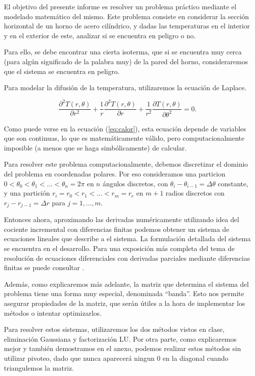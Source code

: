 
El objetivo del presente informe es resolver un problema práctico mediante el modelado matemático del mismo. Este problema consiste en considerar la sección horizontal de un horno de acero cilíndrico, y dadas las temperaturas en el interior y en el exterior de este, analizar si se encuentra en peligro o no.

Para ello, se debe encontrar una cierta isoterma, que si se encuentra muy cerca (para algún significado de la palabra muy) de la pared del horno, consideraremos que el sistema se encuentra en peligro.

Para modelar la difusión de la temperatura, utilizaremos la ecuación de Laplace.

\begin{equation}\label{eq:calor}
\frac{\partial^2T(r,\theta)}{\partial r^{2}}+\frac1r \frac{\partial^2 T(r,\theta)}{\partial r} + \frac{1}{r^2} \frac{\partial T(r, \theta)}{\partial \theta^2} = 0.
\end{equation}

Como puede verse en la ecuación (\ref{eq:calor}), esta ecuación depende de variables que son continuas, lo que es matemáticamente válido, pero computacionalmente imposible (a menos que se haga simbólicamente) de calcular.

Para resolver este problema computacionalmente, debemos discretizar el dominio del problema en coordenadas polares. Por eso consideramos una particion $0 < \theta_0 < \theta_1 < ... < \theta_n = 2\pi$ en $n$ ángulos discretos, con $\theta_i - \theta_{i-1} = \Delta\theta$ constante, y una partición $r_i = r_0 < r_1 < ... < r_m = r_e$ en $m+1$ radios discretos con $r_j - r_{j-1} = \Delta r$ para $j = 1,...,m$.

Entonces ahora, aproximando las derivadas numéricamente utilizando idea del cociente incremental con diferencias finitas podemos obtener un sistema de ecuaciones lineales que describe a el sistema. La formulación detallada del sistema se encuentra en el desarrollo. Para una exposición más completa del tema de resolución de ecuaciones diferenciales con derivadas parciales mediante diferencias finitas se puede consultar \cite[Cap. 11]{burden}.

Además, como explicaremos más adelante, la matriz que determina el sistema del problema tiene una forma muy especial, denominada ``banda''. Esto nos permite asegurar propiedades de la matriz, que serán útiles a la hora de implementar los métodos o intentar optimizarlos.

Para resolver estos sistemas, utilizaremos los dos métodos vistos en clase, eliminación Gaussiana y factorización LU. Por otra parte, como explicaremos mejor y también demostramos en el anexo, podemos realizar estos métodos sin utilizar pivoteo, dado que nunca aparecerá ningun $0$ en la diagonal cuando triangulemos la matriz.


